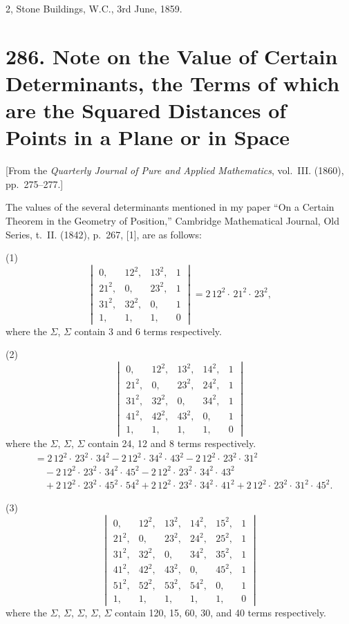 \documentclass[11pt,a4paper]{book}
\begin{document}
\hfill 2, Stone Buildings, W.C., 3rd June, 1859.


\newpage
\section*{286. Note on the Value of Certain Determinants, the Terms of which are the Squared Distances of Points in a Plane or in Space}
\label{sec:286}

[From the \textit{Quarterly Journal of Pure and Applied Mathematics}, vol.~III. (1860), pp.~275--277.]

The values of the several determinants mentioned in my paper ``On a Certain Theorem in the Geometry of Position,'' Cambridge Mathematical Journal, Old Series, t.~II. (1842), p.~267, [1], are as follows:

(1)
\[
\begin{vmatrix}
0, & 12^2, & 13^2, & 1 \\
21^2, & 0, & 23^2, & 1 \\
31^2, & 32^2, & 0, & 1 \\
1, & 1, & 1, & 0
\end{vmatrix}
= 2\,12^2\cdot\,21^2\cdot\,23^2,
\]
where the $\Sigma$, $\Sigma$ contain 3 and 6 terms respectively.

(2)
\[
\begin{vmatrix}
0, & 12^2, & 13^2, & 14^2, & 1 \\
21^2, & 0, & 23^2, & 24^2, & 1 \\
31^2, & 32^2, & 0, & 34^2, & 1 \\
41^2, & 42^2, & 43^2, & 0, & 1 \\
1, & 1, & 1, & 1, & 0
\end{vmatrix}
\]
where the $\Sigma$, $\Sigma$, $\Sigma$ contain 24, 12 and 8 terms respectively.
\begin{align*}
&= 2\,12^2\cdot\,23^2\cdot\,34^2 - 2\,12^2\cdot\,34^2\cdot\,43^2 - 2\,12^2\cdot\,23^2\cdot\,31^2\\
&\quad - 2\,12^2\cdot\,23^2\cdot\,34^2\cdot\,45^2 - 2\,12^2\cdot\,23^2\cdot\,34^2\cdot\,43^2\\
&\quad + 2\,12^2\cdot\,23^2\cdot\,45^2\cdot\,54^2 + 2\,12^2\cdot\,23^2\cdot\,34^2\cdot\,41^2 + 2\,12^2\cdot\,23^2\cdot\,31^2\cdot\,45^2.
\end{align*}

(3)
\[
\begin{vmatrix}
0, & 12^2, & 13^2, & 14^2, & 15^2, & 1 \\
21^2, & 0, & 23^2, & 24^2, & 25^2, & 1 \\
31^2, & 32^2, & 0, & 34^2, & 35^2, & 1 \\
41^2, & 42^2, & 43^2, & 0, & 45^2, & 1 \\
51^2, & 52^2, & 53^2, & 54^2, & 0, & 1 \\
1, & 1, & 1, & 1, & 1, & 0
\end{vmatrix}
\]
where the $\Sigma$, $\Sigma$, $\Sigma$, $\Sigma$, $\Sigma$ contain 120, 15, 60, 30, and 40 terms respectively.
\end{document}
